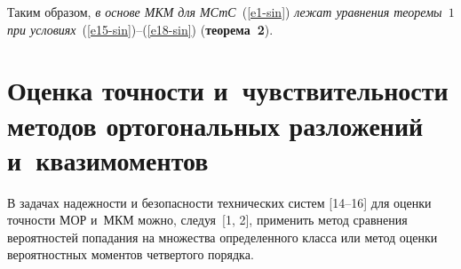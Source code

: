 \begin{multicols}{2}
Таким образом, \textit{в основе МКМ для МСтС}~(\ref{e1-sin})
\textit{лежат уравнения теоремы~$1$ при условиях}~(\ref{e15-sin})--(\ref{e18-sin})
(\textbf{теорема~2}).

\vspace*{-6pt}

\section{Оценка точности и~чувствительности методов ортогональных разложений
и~квазимоментов}


В задачах надежности и безопасности технических систем [14--16] для оценки точности 
МОР и~МКМ можно, следуя~[1, 2], применить метод сравнения вероятностей попадания 
на множества определенного класса или метод оценки вероятностных моментов четвертого 
порядка.


\end{multicols}
